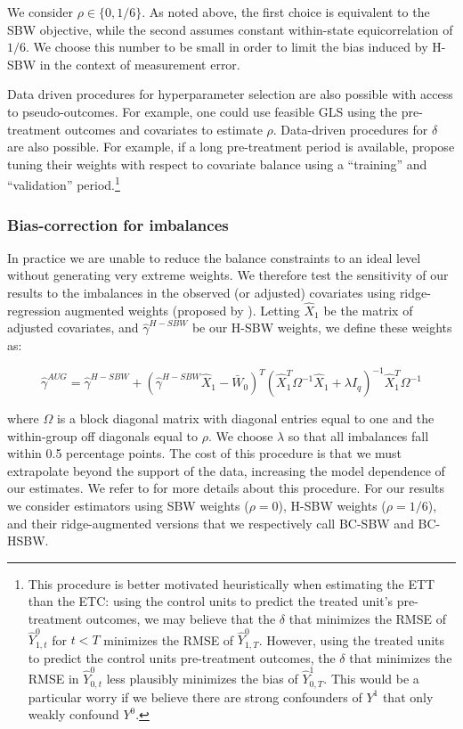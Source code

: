 \documentclass[aoas]{imsart}
\theoremstyle{plain}
\theoremstyle{remark}
\begin{document}
We consider $\rho \in \{0, 1/6\}$. As noted above, the first choice is equivalent to the SBW objective, while the second assumes constant within-state equicorrelation of $1/6$. We choose this number to be small in order to limit the bias induced by H-SBW in the context of measurement error.

Data driven procedures for hyperparameter selection are also possible with access to pseudo-outcomes. For example, one could use feasible GLS using the pre-treatment outcomes and covariates to estimate $\rho$. Data-driven procedures for $\delta$ are also possible. For example, if a long pre-treatment period is available, \cite{abadie2015synthetic} propose tuning their weights with respect to covariate balance using a ``training'' and ``validation'' period.\footnote{This procedure is better motivated heuristically when estimating the ETT than the ETC: using the control units to predict the treated unit's pre-treatment outcomes, we may believe that the $\delta$ that minimizes the RMSE of $\hat{Y}^0_{1, t}$ for $t < T$ minimizes the RMSE of $\hat{Y}^0_{1, T}$. However, using the treated units to predict the control units pre-treatment outcomes, the $\delta$ that minimizes the RMSE in $\hat{Y}^0_{0, t}$ less plausibly minimizes the bias of $\hat{Y}^1_{0, T}$. This would be a particular worry if we believe there are strong confounders of $Y^1$ that only weakly confound $Y^0$.}

\subsubsection{Bias-correction for imbalances}

In practice we are unable to reduce the balance constraints to an ideal level without generating very extreme weights. We therefore test the sensitivity of our results to the imbalances in the observed (or adjusted) covariates using ridge-regression augmented weights (proposed by \cite{ben2018augmented}). Letting $\hat{X}_1$ be the matrix of adjusted covariates, and $\hat{\gamma}^{H-SBW}$ be our H-SBW weights, we define these weights as:

\begin{equation}
\hat{\gamma}^{AUG} = \hat{\gamma}^{H-SBW} + (\hat{\gamma}^{H-SBW}\hat{X}_1 - \bar{W}_0)^T(\hat{X}_1^T\Omega^{-1}\hat{X}_1 + \lambda I_q)^{-1}\hat{X}_1^T\Omega^{-1}
\end{equation}

where $\Omega$ is a block diagonal matrix with diagonal entries equal to one and the within-group off diagonals equal to $\rho$. We choose $\lambda$ so that all imbalances fall within 0.5 percentage points. The cost of this procedure is that we must extrapolate beyond the support of the data, increasing the model dependence of our estimates. We refer to \cite{ben2018augmented} for more details about this procedure. For our results we consider estimators using SBW weights ($\rho = 0$), H-SBW weights ($\rho = 1/6$), and their ridge-augmented versions that we respectively call BC-SBW and BC-HSBW. 
\end{document}
